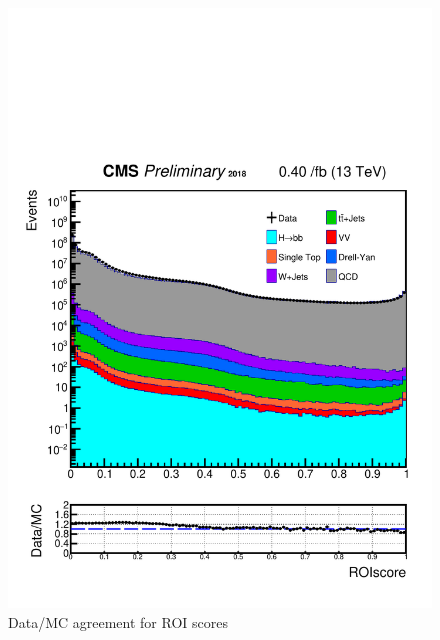 \begin{figure}[h!]
  \caption{Data/MC agreement for ROI scores}
  \label{fig:DataMCscore}
  \centering
  \includegraphics[width=0.67\linewidth]{figs/Data_AnalysisNoteplot_MS-15_ctauS-10_ROIscore.pdf}

\end{figure}



